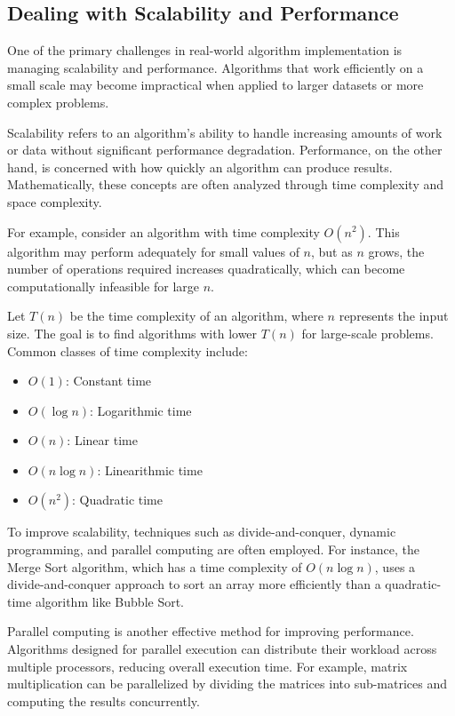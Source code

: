 \documentclass[12pt]{book} %
\begin{document}
\subsection{Dealing with Scalability and Performance}
One of the primary challenges in real-world algorithm implementation is managing scalability and performance. Algorithms that work efficiently on a small scale may become impractical when applied to larger datasets or more complex problems.

Scalability refers to an algorithm's ability to handle increasing amounts of work or data without significant performance degradation. Performance, on the other hand, is concerned with how quickly an algorithm can produce results. Mathematically, these concepts are often analyzed through time complexity and space complexity.

For example, consider an algorithm with time complexity $O(n^2)$. This algorithm may perform adequately for small values of $n$, but as $n$ grows, the number of operations required increases quadratically, which can become computationally infeasible for large $n$.

Let $T(n)$ be the time complexity of an algorithm, where $n$ represents the input size. The goal is to find algorithms with lower $T(n)$ for large-scale problems. Common classes of time complexity include:
\begin{itemize}
    \item $O(1)$: Constant time
    \item $O(\log n)$: Logarithmic time
    \item $O(n)$: Linear time
    \item $O(n \log n)$: Linearithmic time
    \item $O(n^2)$: Quadratic time
\end{itemize}

To improve scalability, techniques such as divide-and-conquer, dynamic programming, and parallel computing are often employed. For instance, the Merge Sort algorithm, which has a time complexity of $O(n \log n)$, uses a divide-and-conquer approach to sort an array more efficiently than a quadratic-time algorithm like Bubble Sort.

Parallel computing is another effective method for improving performance. Algorithms designed for parallel execution can distribute their workload across multiple processors, reducing overall execution time. For example, matrix multiplication can be parallelized by dividing the matrices into sub-matrices and computing the results concurrently.
\end{document}

